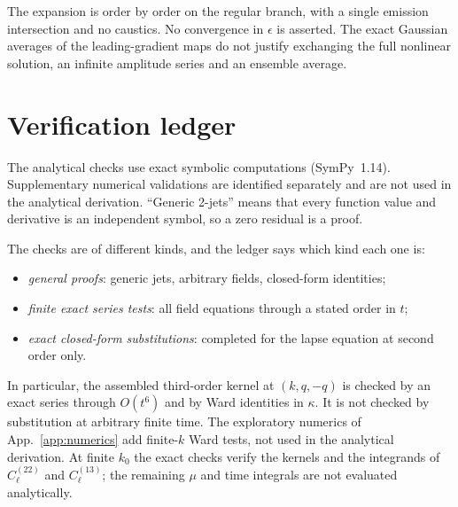 \documentclass[11pt]{article}
\theoremstyle{definition}
\theoremstyle{remark}
\newcommand{\eps}{\epsilon}
\begin{document}
The expansion is order by order on the regular branch, with a single emission intersection
and no caustics. No convergence in $\eps$ is asserted. The exact Gaussian averages of the
leading-gradient maps do not justify exchanging the full nonlinear solution, an infinite
amplitude series and an ensemble average.

\appendix




\section{Verification ledger}\label{sec:ledger}
The analytical checks use exact symbolic computations (SymPy~1.14).
Supplementary numerical validations are identified separately and are not used in the
analytical derivation. ``Generic 2-jets'' means that every function value and derivative is
an independent symbol, so a zero residual is a proof.

The checks are of different kinds, and the ledger says which kind each one is:
\begin{itemize}
\item \emph{general proofs}: generic jets, arbitrary fields, closed-form identities;
\item \emph{finite exact series tests}: all field equations through a stated order in $t$;
\item \emph{exact closed-form substitutions}: completed for the lapse equation at second order
  only.
\end{itemize}
In particular, the assembled third-order kernel at $(k,q,-q)$ is checked by an exact series
through $O(t^6)$ and by Ward identities in $\kappa$. It is not checked by substitution at
arbitrary finite time. The exploratory numerics of App.~\ref{app:numerics} add finite-$k$
Ward tests, not used in the analytical derivation. At finite $k_0$ the exact checks verify the kernels and the integrands of
$C^{(22)}_\ell$ and $C^{(13)}_\ell$; the remaining $\mu$ and time integrals are not evaluated
analytically.
\end{document}
